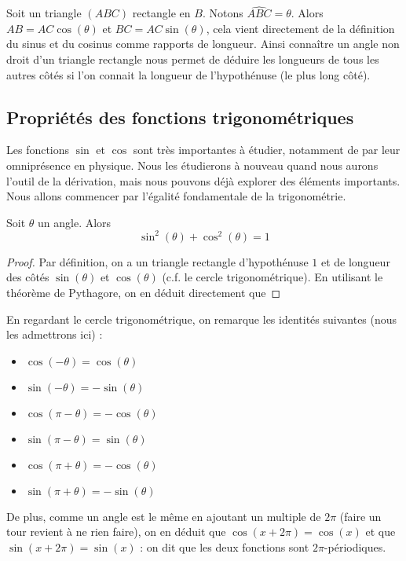 \begin{rmk}
    Soit un triangle $(ABC)$ rectangle en $B$. Notons $\widehat{ABC}=\theta$. Alors $AB=AC\cos(\theta)$ et $BC=AC\sin(\theta)$, cela vient directement de la définition du sinus et du cosinus comme rapports de longueur. Ainsi connaître un angle non droit d'un triangle rectangle nous permet de déduire les longueurs de tous les autres côtés si l'on connait la longueur de l'hypothénuse (le plus long côté).
\end{rmk}

\subsection{Propriétés des fonctions trigonométriques}

Les fonctions $\sin$ et $\cos$ sont très importantes à étudier, notamment de par leur omniprésence en physique. Nous les étudierons à nouveau quand nous aurons l'outil de la dérivation, mais nous pouvons déjà explorer des éléments importants. Nous allons commencer par l'égalité fondamentale de la trigonométrie.

\begin{prop}
    Soit $\theta$ un angle. Alors $$\sin^2(\theta)+\cos^2(\theta)=1$$
\end{prop}
\begin{proof}
    Par définition, on a un triangle rectangle d'hypothénuse $1$ et de longueur des côtés $\sin(\theta)$ et $\cos(\theta)$ (c.f. le cercle trigonométrique). En utilisant le théorème de Pythagore, on en déduit directement que 
\end{proof}

En regardant le cercle trigonométrique, on remarque les identités suivantes (nous les admettrons ici) :
\begin{itemize}[label=$\bullet$]
    \item $\cos(-\theta)=\cos(\theta)$
    \item $\sin(-\theta)=-\sin(\theta)$
    \item $\cos(\pi-\theta)=-\cos(\theta)$
    \item $\sin(\pi-\theta)=\sin(\theta)$
    \item $\cos(\pi+\theta)=-\cos(\theta)$
    \item $\sin(\pi+\theta)=-\sin(\theta)$
\end{itemize}

De plus, comme un angle est le même en ajoutant un multiple de $2\pi$ (faire un tour revient à ne rien faire), on en déduit que $\cos(x+2\pi)=\cos(x)$ et que $\sin(x+2\pi)=\sin(x)$ : on dit que les deux fonctions sont $2\pi$-périodiques.

